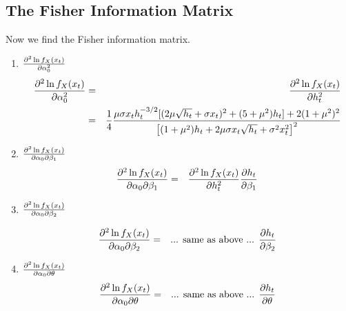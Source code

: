 \documentclass{book}
\begin{document}
\subsection{The Fisher Information Matrix}
Now we find the Fisher information matrix.
\begin{enumerate}

\item ${\partial^2 \ln f_X(x_t)  \over  \partial \alpha_0^2}$
  \begin{eqnarray*}
    {\partial^2 \ln f_X(x_t) \over \partial \alpha_0^2} &=&
    {\partial^2 \ln f_X(x_t) \over \partial h_t^2} \\
    &=& {1 \over 4}{\mu\sigma x_t h_t^{-3/2} [
      (2\mu\sqrt{h_t} + \sigma x_t)^2 + (5 + \mu^2)h_t
      ] + 2(1 + \mu^2)^2
      \over
      \left[(1 + \mu^2)h_t  +2\mu\sigma x_t \sqrt{h_t} + \sigma^2 x_t^2\right]^2
    }
  \end{eqnarray*}

\item ${\partial^2 \ln f_X(x_t)  \over  \partial \alpha_0 \partial \beta_1}$
  \begin{eqnarray*}
    {\partial^2 \ln f_X(x_t) \over \partial\alpha_0 \partial \beta_1} &=&
    {\partial^2 \ln f_X(x_t) \over \partial h_t^2} {\partial h_t \over \partial \beta_1}
  \end{eqnarray*}

\item ${\partial^2 \ln f_X(x_t)  \over  \partial \alpha_0 \partial \beta_2}$

  \begin{eqnarray*}
    {\partial^2 \ln f_X(x_t) \over \partial\alpha_0 \partial \beta_2}
    &=&
    \text{... same as above ... } {\partial h_t \over \partial \beta_2} \\
  \end{eqnarray*}

\item ${\partial^2 \ln f_X(x_t)  \over  \partial \alpha_0 \partial \theta}$
  \begin{eqnarray*}
    {\partial^2 \ln f_X(x_t) \over \partial\alpha_0 \partial \theta}
    &=&
    \text{... same as above ... } {\partial h_t \over \partial \theta}
  \end{eqnarray*}


\end{enumerate}
\end{document}
